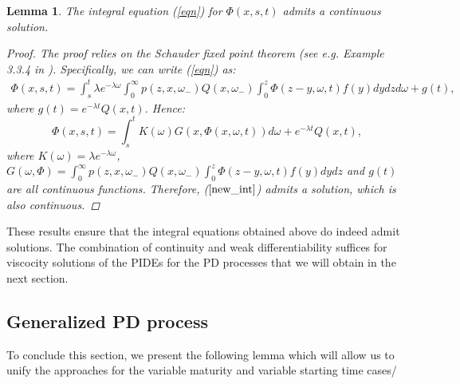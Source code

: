 \documentclass[11pt,reqno]{article}
\newtheorem{lemma}[theorem]{Lemma}
\theoremstyle{definition}
\begin{document}
\begin{lemma}
	The integral equation (\ref{eqn}) for $\Phi(x,s,t)$ admits a continuous solution.
	\begin{proof}
		The proof relies on the Schauder fixed point theorem (see e.g. Example 3.3.4 in \cite{kravvaritis2020variational}). Specifically, we can write (\ref{eqn}) as: 
		\begin{eqnarray}\label{new_int}
			\Phi(x,s,t) = \int_{s}^{t} \lambda e^{-\lambda \omega} \int_{0}^{\infty}p(z,x,\omega_-) Q(x,\omega_-) \int_{0}^{z} \Phi(z-y, \omega,t) f(y) dy dz d\omega + g(t),
		\end{eqnarray}
		where $g(t) = e^{-\lambda t} Q(x,t)$. Hence: 
		$$ \Phi(x,s,t) = \int_{s}^{t} K(\omega) G(x,\Phi(x,\omega,t)) d\omega + e^{-\lambda t}Q(x,t), $$
		where $K(\omega) = \lambda e^{-\lambda\omega}$, $G(\omega,\Phi) = \int_{0}^{\infty}p(z,x,\omega_-) Q(x,\omega_-) \int_{0}^{z} \Phi(z-y, \omega,t) f(y) dy dz$ and $g(t)$  are all continuous functions. Therefore, ($\ref{new_int}$) admits a solution, which is also continuous.
	\end{proof} 
\end{lemma}

These results ensure that the integral equations obtained above do indeed admit solutions. The combination of continuity and weak differentiability suffices for viscocity solutions of the PIDEs for the PD processes that we will obtain in the next section.  


\subsection{Generalized PD process}
To conclude this section, we present the following lemma which will allow us to unify the approaches for the variable maturity and variable starting time cases/ %
\end{document}

